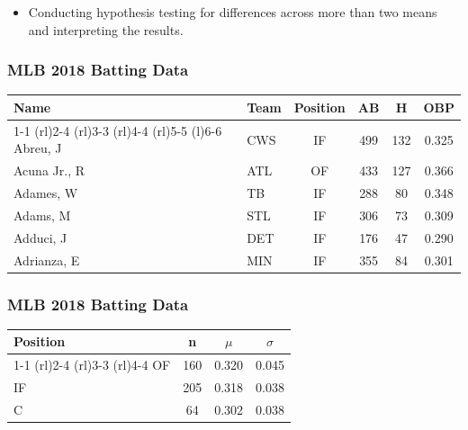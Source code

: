 \documentclass{beamer}
\begin{document}
\begin{frame}
  \begin{itemize}
    \item[] 
      Conducting hypothesis testing for differences across more than
      two means and interpreting the results. 
  \end{itemize}
\end{frame}

\begin{frame}
  \frametitle{MLB 2018 Batting Data}
  \centering
  \begin{table}
    \begin{tabular}{@{}llcccc@{}}
      \toprule
      Name & Team & Position & AB & H & OBP  \\
      \cmidrule(r){1-1} \cmidrule(rl){2-4} \cmidrule(rl){3-3}
      \cmidrule(rl){4-4} \cmidrule(rl){5-5} \cmidrule(l){6-6}
      Abreu, J & CWS & IF & 499 & 132 & 0.325 \\
      Acuna Jr., R & ATL & OF & 433 & 127 & 0.366 \\
      Adames, W & TB & IF & 288 & 80 & 0.348 \\
      Adams, M & STL & IF & 306 & 73 & 0.309 \\
      Adduci, J & DET & IF & 176 & 47 & 0.290 \\
      Adrianza, E & MIN & IF & 355 & 84 & 0.301 \\
      \bottomrule 
    \end{tabular}
  \end{table}
\end{frame}

\begin{frame}
  \frametitle{MLB 2018 Batting Data}
  \centering
  \begin{table}
    \begin{tabular}{@{}lccc@{}}
      \toprule
      Position & n & $\mu$ & $\sigma$  \\
      \cmidrule(r){1-1} \cmidrule(rl){2-4} \cmidrule(rl){3-3}
      \cmidrule(rl){4-4} 
      OF & 160 & 0.320 & 0.045 \\
      IF & 205 & 0.318 & 0.038 \\
      C & 64 & 0.302 & 0.038 \\
      \bottomrule 
    \end{tabular}
  \end{table}
\end{frame}
\end{document}
